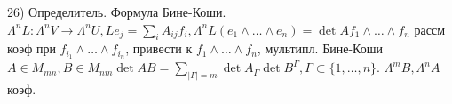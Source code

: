 26) Определитель. Формула Бине-Коши.\\
$\Lambda^nL\colon \Lambda^nV \to \Lambda^nU, Le_j = \sum\limits_{i}A_{ij}f_i, \Lambda^nL(e_1 \wedge \dots \wedge e_n) = \det A f_1 \wedge \dots \wedge f_n$ рассм коэф при $f_{i_1} \wedge \dots \wedge f_{i_n}$, привести к $f_1 \wedge \dots \wedge f_n$, мультипл. Бине-Коши $A \in M_{mn}, B \in M_{nm} \det AB = \sum\limits_{|\Gamma| = m} \det A_{\Gamma} \det B^{\Gamma}, \Gamma \subset \{1, \dots, n\}$. $\Lambda^mB, \Lambda^nA$ коэф.\\
